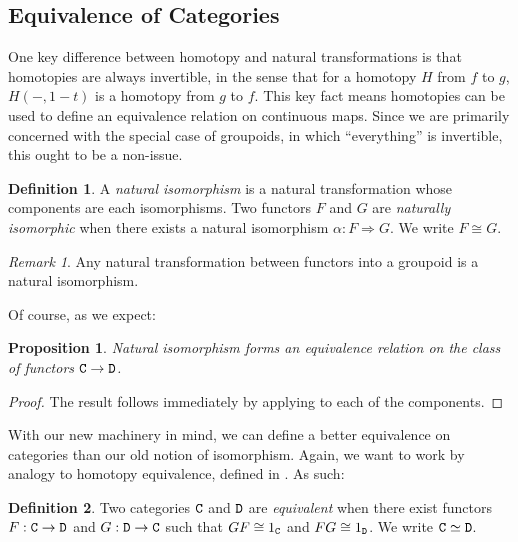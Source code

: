 \documentclass[11 pt]{amsart}
\theoremstyle{plain}   %
\newtheorem{prop}{Proposition}[section]
\theoremstyle{definition}
\newtheorem{defn}{Definition}[section]
\theoremstyle{remark}
\newtheorem{rem}{Remark}[section]
\numberwithin{equation}{section}
\def\nat{\Rightarrow}
\newcommand{\cat}[1]{{\normalfont\texttt{#1}}}
\begin{document}
\subsection{Equivalence of Categories}

One key difference between homotopy and natural transformations is that
homotopies are always invertible, in the sense that for a homotopy $H$ from $f$
to $g$, $H(-, 1-t)$ is a homotopy from $g$ to $f$. This key fact means
homotopies can be used to define an equivalence relation on continuous maps.
Since we are primarily concerned with the special case of groupoids, in which
``everything'' is invertible, this ought to be a non-issue.

\begin{defn}
	A \emph{natural isomorphism} is a natural transformation whose components are
	each isomorphisms. Two functors $F$ and $G$ are \emph{naturally isomorphic}
	when there exists a natural isomorphism $\alpha: F\nat G$. We write $F\cong
		G$.
\end{defn}

\begin{rem}
	Any natural transformation between functors into a groupoid is a natural
	isomorphism.
\end{rem}

Of course, as we expect:

\begin{prop}\label{natural isomorphism is equivalence}
	Natural isomorphism forms an equivalence relation on the class of functors
	$\cat{C}\rightarrow\cat{D}$.
\end{prop}

\begin{proof}
	The result follows immediately by applying 
	to each of the components.
\end{proof}

With our new machinery in mind, we can define a better equivalence on categories
than our old notion of isomorphism. Again, we want to work by analogy to
homotopy equivalence, defined in . As such:

\begin{defn}\label{equivalence of categories}
	Two categories $\cat{C}$ and $\cat{D}$ are \emph{equivalent} when there exist
	functors $F:\cat{C}\rightarrow\cat{D}$ and $G:\cat{D}\rightarrow\cat{C}$ such
	that $GF\cong 1_\cat{C}$ and $FG\cong 1_\cat{D}$. We write
	$\cat{C}\simeq\cat{D}$.
\end{defn}
\end{document}
